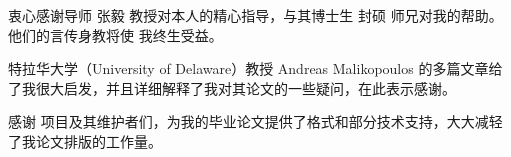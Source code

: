 \begin{acknowledgement}
  衷心感谢导师 张毅 教授对本人的精心指导，与其博士生 封硕 师兄对我的帮助。他们的言传身教将使
  我终生受益。

  特拉华大学（University of Delaware）教授 Andreas Malikopoulos 的多篇文章给了我很大启发，并且详细解释了我对其论文的一些疑问，在此表示感谢。

  感谢 \thuthesis 项目及其维护者们，为我的毕业论文提供了格式和部分技术支持，大大减轻了我论文排版的工作量。
\end{acknowledgement}
